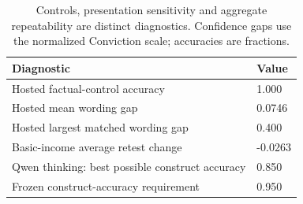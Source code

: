 \begin{table}[htbp]
\centering
\footnotesize
\caption{Controls, presentation sensitivity and aggregate repeatability are distinct diagnostics. Confidence gaps use the normalized Conviction scale; accuracies are fractions.}
\label{tab:diagnostics}
\begin{tabular}{ p{14.88cm}l }
\toprule
Diagnostic & Value \\
\midrule
Hosted factual-control accuracy & 1.000 \\
Hosted mean wording gap & 0.0746 \\
Hosted largest matched wording gap & 0.400 \\
Basic-income average retest change & -0.0263 \\
Qwen thinking: best possible construct accuracy & 0.850 \\
Frozen construct-accuracy requirement & 0.950 \\
\bottomrule
\end{tabular}
\end{table}

